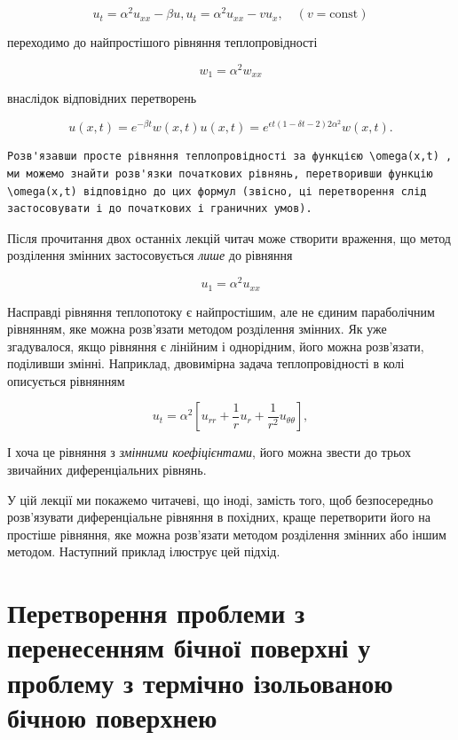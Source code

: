 \documentclass[
  ukrainian,
]{article}
\begin{document}
\[
u_t = \alpha^2 u_{xx} - \beta u,
u_t = \alpha^2 u_{xx} - v u_x, \quad (v = \text{const})
\]

переходимо до найпростішого рівняння теплопровідності

\[
w_1 = \alpha^2 w_{xx}
\]

внаслідок відповідних перетворень

\[
u(x, t) = e^{-\beta t} w(x, t)
u(x, t) = e^{\epsilon t (1 - \delta t - 2) 2\alpha^2} w(x, t).
\]

\begin{verbatim}
Розв'язавши просте рівняння теплопровідності за функцією \omega(x,t) , ми можемо знайти розв'язки початкових рівнянь, перетворивши функцію \omega(x,t) відповідно до цих формул (звісно, ці перетворення слід застосовувати і до початкових і граничних умов).
\end{verbatim}

Після прочитання двох останніх лекцій читач може створити враження, що
метод розділення змінних застосовується \emph{лише} до рівняння

\[
u_1 = \alpha^2 u_{xx}
\]

Насправді рівняння теплопотоку є найпростішим, але не єдиним
параболічним рівнянням, яке можна розв'язати методом розділення змінних.
Як уже згадувалося, якщо рівняння є лінійним і однорідним, його можна
розв'язати, поділивши змінні. Наприклад, двовимірна задача
теплопровідності в колі описується рівнянням

\[
u_t = \alpha^2 \left[ u_{rr} + \frac{1}{r} u_r + \frac{1}{r^2} u_{\theta\theta} \right],
\]

І хоча це рівняння з \emph{змінними коефіцієнтами}, його можна звести до
трьох звичайних диференціальних рівнянь.

У цій лекції ми покажемо читачеві, що іноді, замість того, щоб
безпосередньо розв'язувати диференціальне рівняння в похідних, краще
перетворити його на простіше рівняння, яке можна розв'язати методом
розділення змінних або іншим методом. Наступний приклад ілюструє цей
підхід.

\section{Перетворення проблеми з перенесенням бічної поверхні у проблему
з термічно ізольованою бічною
поверхнею}\label{ux43fux435ux440ux435ux442ux432ux43eux440ux435ux43dux43dux44f-ux43fux440ux43eux431ux43bux435ux43cux438-ux437-ux43fux435ux440ux435ux43dux435ux441ux435ux43dux43dux44fux43c-ux431ux456ux447ux43dux43eux457-ux43fux43eux432ux435ux440ux445ux43dux456-ux443-ux43fux440ux43eux431ux43bux435ux43cux443-ux437-ux442ux435ux440ux43cux456ux447ux43dux43e-ux456ux437ux43eux43bux44cux43eux432ux430ux43dux43eux44e-ux431ux456ux447ux43dux43eux44e-ux43fux43eux432ux435ux440ux445ux43dux435ux44e}
\end{document}
